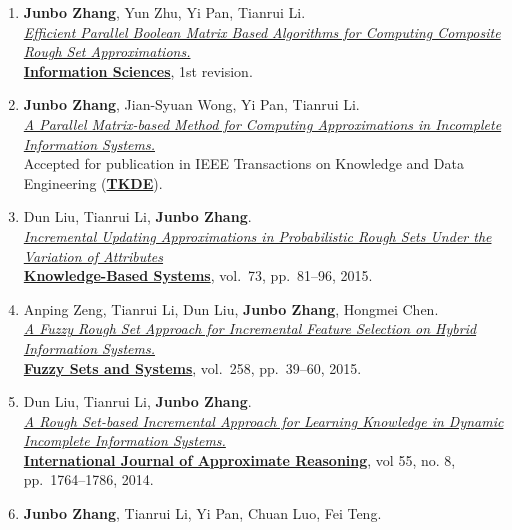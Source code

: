 \documentclass[]{article}
\begin{document}
\begin{enumerate}
\def\labelenumi{\arabic{enumi}.}
\item
  \textbf{Junbo Zhang}, Yun Zhu, Yi Pan, Tianrui Li.\\
  \href{}{\emph{Efficient Parallel Boolean Matrix Based Algorithms for
  Computing Composite Rough Set Approximations.}}\\
  \href{http://www.journals.elsevier.com/information-sciences}{\textbf{Information
  Sciences}}, 1st revision.
\item
  \textbf{Junbo Zhang}, Jian-Syuan Wong, Yi Pan, Tianrui Li.\\
  \href{http://dx.doi.org/10.1109/TKDE.2014.2330821}{\emph{A Parallel
  Matrix-based Method for Computing Approximations in Incomplete
  Information Systems.}}\\ Accepted for publication in IEEE Transactions
  on Knowledge and Data Engineering
  (\href{http://www.computer.org/portal/web/tkde}{\textbf{TKDE}}).
\item
  Dun Liu, Tianrui Li, \textbf{Junbo Zhang}.\\
  \href{http://dx.doi.org/10.1016/j.knosys.2014.09.008}{\emph{Incremental
  Updating Approximations in Probabilistic Rough Sets Under the
  Variation of Attributes}}\\
  \href{http://www.journals.elsevier.com/knowledge-based-systems}{\textbf{Knowledge-Based
  Systems}}, vol.~73, pp.~81--96, 2015.
\item
  Anping Zeng, Tianrui Li, Dun Liu, \textbf{Junbo Zhang}, Hongmei
  Chen.\\ \href{http://dx.doi.org/10.1016/j.fss.2014.08.014}{\emph{A
  Fuzzy Rough Set Approach for Incremental Feature Selection on Hybrid
  Information Systems.}}\\
  \href{http://www.journals.elsevier.com/fuzzy-sets-and-systems}{\textbf{Fuzzy
  Sets and Systems}}, vol.~258, pp.~39--60, 2015.
\item
  Dun Liu, Tianrui Li, \textbf{Junbo Zhang}.\\
  \href{http://dx.doi.org/10.1016/j.ijar.2014.05.009}{\emph{A Rough
  Set-based Incremental Approach for Learning Knowledge in Dynamic
  Incomplete Information Systems.}}\\
  \href{http://www.journals.elsevier.com/international-journal-of-approximate-reasoning}{\textbf{International
  Journal of Approximate Reasoning}}, vol 55, no. 8, pp.~1764--1786,
  2014.
\item
  \textbf{Junbo Zhang}, Tianrui Li, Yi Pan, Chuan Luo, Fei Teng.\\

\end{enumerate}
\end{document}
